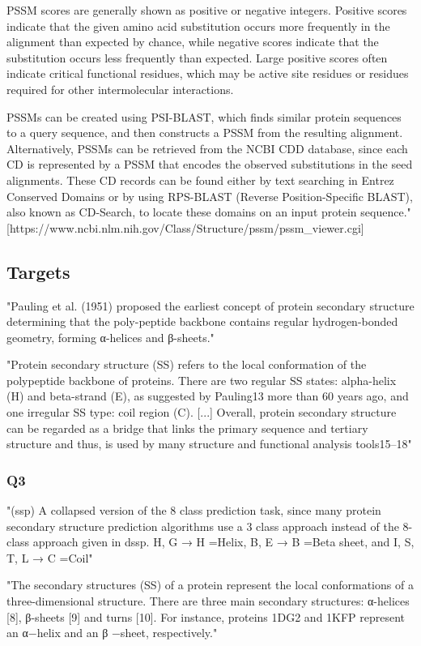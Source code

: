 	PSSM scores are generally shown as positive or negative integers. Positive scores indicate that the given amino acid substitution occurs more frequently in the alignment than expected by chance, while negative scores indicate that the substitution occurs less frequently than expected. Large positive scores often indicate critical functional residues, which may be active site residues or residues required for other intermolecular interactions.
	
	PSSMs can be created using PSI-BLAST, which finds similar protein sequences to a query sequence, and then constructs a PSSM from the resulting alignment. Alternatively, PSSMs can be retrieved from the NCBI CDD database, since each CD is represented by a PSSM that encodes the observed substitutions in the seed alignments. These CD records can be found either by text searching in Entrez Conserved Domains or by using RPS-BLAST (Reverse Position-Specific BLAST), also known as CD-Search, to locate these domains on an input protein sequence." [https://www.ncbi.nlm.nih.gov/Class/Structure/pssm/pssm_viewer.cgi]

 \subsection{Targets}
 "Pauling et al. (1951) proposed the earliest concept of protein secondary structure determining that the poly-peptide backbone contains regular hydrogen-bonded geometry, forming α-helices and β-sheets." \cite{Fang2017}

 "Protein secondary structure (SS) refers to the local conformation of the polypeptide backbone of proteins. There are two regular SS states: alpha-helix (H) and beta-strand (E), as suggested by Pauling13 more than 60 years ago, and one irregular SS type: coil region (C). [...] Overall, protein secondary structure can be regarded as a bridge that links the primary sequence and tertiary structure and thus, is used by many structure and functional analysis tools15–18" \cite{Wang2016}
  \subsubsection{Q3}
  "(ssp) A collapsed version of the 8 class prediction task, since many protein secondary structure prediction algorithms use a 3 class approach instead of the 8-class approach given in dssp. {H, G} → H =Helix, {B, E} → B =Beta sheet, and {I, S, T, L} → C =Coil" \cite{Lin2016}

  "The secondary structures (SS) of a protein represent the local conformations of a three-dimensional structure. There are three main secondary structures: α-helices [8], β-sheets [9] and turns [10]. For instance, proteins 1DG2 and 1KFP represent an α−helix and an β −sheet, respectively." \cite{Hattori2017}

